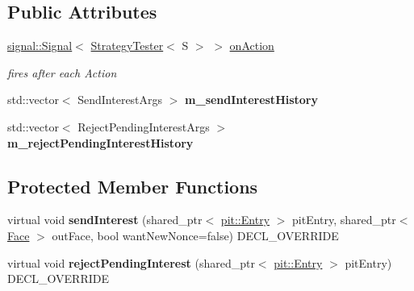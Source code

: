 \subsection*{Public Attributes}
\begin{DoxyCompactItemize}
\item 
\hyperlink{classndn_1_1util_1_1signal_1_1Signal}{signal\+::\+Signal}$<$ \hyperlink{classnfd_1_1fw_1_1tests_1_1StrategyTester}{Strategy\+Tester}$<$ S $>$ $>$ \hyperlink{classnfd_1_1fw_1_1tests_1_1StrategyTester_a9bb3bfc070a8aeb01abc76752b1aaf19}{on\+Action}\hypertarget{classnfd_1_1fw_1_1tests_1_1StrategyTester_a9bb3bfc070a8aeb01abc76752b1aaf19}{}\label{classnfd_1_1fw_1_1tests_1_1StrategyTester_a9bb3bfc070a8aeb01abc76752b1aaf19}

\begin{DoxyCompactList}\small\item\em fires after each Action \end{DoxyCompactList}\item 
std\+::vector$<$ Send\+Interest\+Args $>$ {\bfseries m\+\_\+send\+Interest\+History}\hypertarget{classnfd_1_1fw_1_1tests_1_1StrategyTester_a1cedf7a8fe25cf30b0037a30c0cce7f5}{}\label{classnfd_1_1fw_1_1tests_1_1StrategyTester_a1cedf7a8fe25cf30b0037a30c0cce7f5}

\item 
std\+::vector$<$ Reject\+Pending\+Interest\+Args $>$ {\bfseries m\+\_\+reject\+Pending\+Interest\+History}\hypertarget{classnfd_1_1fw_1_1tests_1_1StrategyTester_a696cbde7cc3cdc455f89ce0d12b4fcfa}{}\label{classnfd_1_1fw_1_1tests_1_1StrategyTester_a696cbde7cc3cdc455f89ce0d12b4fcfa}

\end{DoxyCompactItemize}
\subsection*{Protected Member Functions}
\begin{DoxyCompactItemize}
\item 
virtual void {\bfseries send\+Interest} (shared\+\_\+ptr$<$ \hyperlink{classnfd_1_1pit_1_1Entry}{pit\+::\+Entry} $>$ pit\+Entry, shared\+\_\+ptr$<$ \hyperlink{classnfd_1_1Face}{Face} $>$ out\+Face, bool want\+New\+Nonce=false) D\+E\+C\+L\+\_\+\+O\+V\+E\+R\+R\+I\+DE\hypertarget{classnfd_1_1fw_1_1tests_1_1StrategyTester_a30c2957e2c47de74e4057d3cd16d701e}{}\label{classnfd_1_1fw_1_1tests_1_1StrategyTester_a30c2957e2c47de74e4057d3cd16d701e}

\item 
virtual void {\bfseries reject\+Pending\+Interest} (shared\+\_\+ptr$<$ \hyperlink{classnfd_1_1pit_1_1Entry}{pit\+::\+Entry} $>$ pit\+Entry) D\+E\+C\+L\+\_\+\+O\+V\+E\+R\+R\+I\+DE\hypertarget{classnfd_1_1fw_1_1tests_1_1StrategyTester_a0294a99d92cb141b882b642f88cb4d86}{}\label{classnfd_1_1fw_1_1tests_1_1StrategyTester_a0294a99d92cb141b882b642f88cb4d86}

\end{DoxyCompactItemize}


